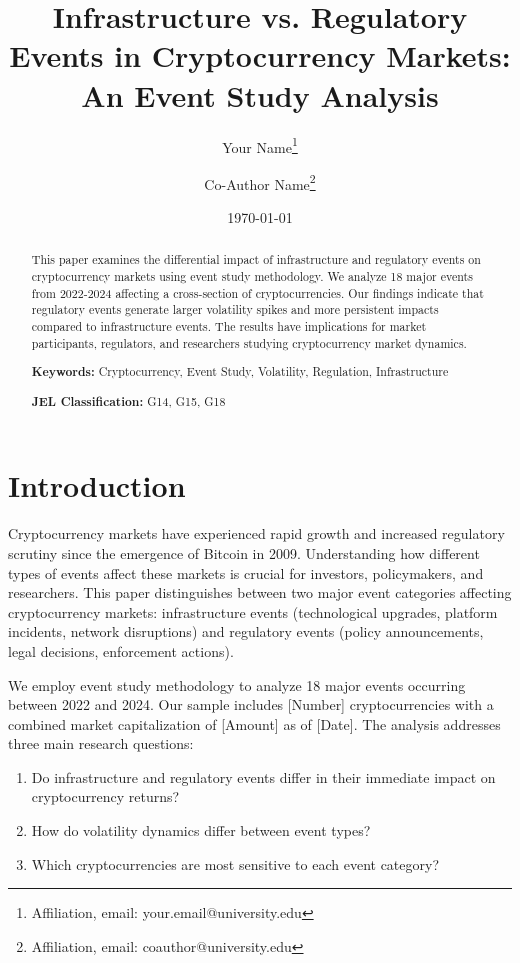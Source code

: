 \documentclass[12pt]{article}
\title{Infrastructure vs. Regulatory Events in Cryptocurrency Markets: \\
       An Event Study Analysis}
\author{
    Your Name\thanks{Affiliation, email: your.email@university.edu} \\
    \and
    Co-Author Name\thanks{Affiliation, email: coauthor@university.edu}
}
\date{\today}
\begin{document}
\maketitle

\begin{abstract}
This paper examines the differential impact of infrastructure and regulatory events on cryptocurrency markets using event study methodology. We analyze 18 major events from 2022-2024 affecting a cross-section of cryptocurrencies. Our findings indicate that regulatory events generate larger volatility spikes and more persistent impacts compared to infrastructure events. The results have implications for market participants, regulators, and researchers studying cryptocurrency market dynamics.

\textbf{Keywords:} Cryptocurrency, Event Study, Volatility, Regulation, Infrastructure

\textbf{JEL Classification:} G14, G15, G18
\end{abstract}

\newpage


\section{Introduction}

Cryptocurrency markets have experienced rapid growth and increased regulatory scrutiny since the emergence of Bitcoin in 2009. Understanding how different types of events affect these markets is crucial for investors, policymakers, and researchers. This paper distinguishes between two major event categories affecting cryptocurrency markets: infrastructure events (technological upgrades, platform incidents, network disruptions) and regulatory events (policy announcements, legal decisions, enforcement actions).

We employ event study methodology to analyze 18 major events occurring between 2022 and 2024. Our sample includes [Number] cryptocurrencies with a combined market capitalization of [Amount] as of [Date]. The analysis addresses three main research questions:

\begin{enumerate}
    \item Do infrastructure and regulatory events differ in their immediate impact on cryptocurrency returns?
    \item How do volatility dynamics differ between event types?
    \item Which cryptocurrencies are most sensitive to each event category?
\end{enumerate}
\end{document}
